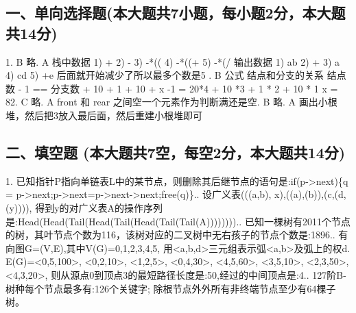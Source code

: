 \subsection{一、单向选择题(本大题共7小题，每小题2分，本大题共14分)}
1.\newline
B \newline 
略.\newline
A \newline
栈中数据 1) +  2) - 3) -*(( 4) -*((+ 5) -*(/ \newline
输出数据 1) ab 2) + 3) a    4) cd    5) +e   后面就开始减少了所以最多个数是5 .\newline
B \newline
公式 结点和分支的关系 结点数 - 1 == 分支数 + 10 + 1 + 10 + x -1 = 20*4 + 10 *3 + 1 * 2 + 10 * 1\newline
x = 82.\newline
C \newline
略.\newline
A \newline
front 和 rear 之间空一个元素作为判断满还是空. \newline
B\newline
略. \newline
A \newline
画出小根堆，然后把3放入最后面，然后重建小根堆即可\newline
\subsection{二、填空题 (本大题共7空，每空2分，本大题共14分)}
1. 已知指针P指向单链表L中的某节点，则删除其后继节点的语句是:if(p->next)\{q = p->next;p->next=p->next->next;free(q)\}.. 设广义表(((a,b), x),((a),(b)),(c,(d,(y)))), 得到y的对广义表A的操作序列是:Head(Head(Tail(Head(Tail(Head(Tail(Tail(A)))))))).. 已知一棵树有2011个节点的树，其叶节点个数为116，该树对应的二叉树中无右孩子的节点个数是:1896.. 有向图G=(V,E),其中V(G)={0,1,2,3,4,5}, 用<a,b,d>三元组表示弧<a,b>及弧上的权d. E(G)={<0,5,100>, <0,2,10>, <1,2,5>, <0,4,30>, <4,5,60>, <3,5,10>, <2,3,50>, <4,3,20>}, 则从源点0到顶点3的最短路径长度是:50,经过的中间顶点是:4.. 127阶B-树种每个节点最多有:126个关键字; 除根节点外外所有非终端节点至少有64棵子树。\newline
